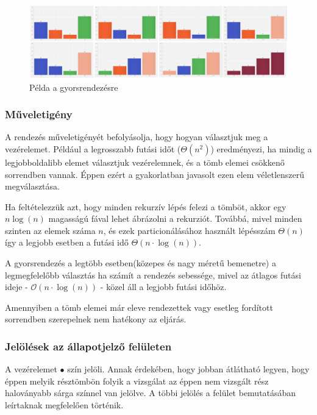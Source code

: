 \documentclass{elteikthesis}
\newcommand{\hiddensubsubsection}[1]{
	\stepcounter{subsubsection}
	\subsubsection*{{#1}}	
}
\begin{document}
 \begin{figure}[H]
 	\centering
 	\includegraphics[width=1\textwidth]{pics/quick.jpg}
 	\caption{Példa a gyorsrendezésre}
 \end{figure}\par
\hiddensubsubsection{Műveletigény}
A rendezés műveletigényét befolyásolja, hogy hogyan választjuk meg a vezérelemet. Például a legrosszabb futási időt ($\Theta(n^2)$) eredményezi, ha mindig a legjobboldalibb elemet választjuk vezérelemnek, és a tömb elemei csökkenő sorrendben vannak\cite{Cormen}. Éppen ezért a gyakorlatban javasolt ezen elem véletlenszerű megválasztása.\par
Ha feltételezzük azt, hogy minden rekurzív lépés felezi a tömböt, akkor egy $n\log(n)$ magasságú fával lehet ábrázolni a rekurziót. Továbbá, mivel minden szinten az elemek száma $n$, és ezek particionálásához használt lépésszám $\Theta(n)$ így a legjobb esetben a futási idő $\Theta(n\cdot\log(n))$.\par
 A gyorsrendezés a legtöbb esetben(közepes és nagy méretű bemenetre) a legmegfelelőbb választás ha számít a rendezés sebessége, mivel az átlagos futási ideje - $\mathcal{O}(n\cdot\log(n))$ - közel áll a legjobb futási időhöz\cite{Cormen}.\par
 Amennyiben a tömb elemei már eleve rendezettek vagy esetleg fordított sorrendben szerepelnek nem hatékony az eljárás.
\hiddensubsubsection{Jelölések az állapotjelző felületen}
A vezérelemet \textcolor{select}{\Huge$\bullet$} szín jelöli. Annak érdekében, hogy jobban átlátható legyen, hogy éppen melyik résztömbön folyik a vizsgálat az éppen nem vizsgált rész haloványabb sárga színnel van jelölve. A többi jelölés a felület bemutatásában leírtaknak megfelelően történik.
\end{document}
